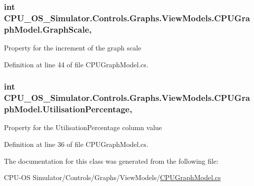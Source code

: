 \subsubsection[{Graph\+Scale}]{\setlength{\rightskip}{0pt plus 5cm}int C\+P\+U\+\_\+\+O\+S\+\_\+\+Simulator.\+Controls.\+Graphs.\+View\+Models.\+C\+P\+U\+Graph\+Model.\+Graph\+Scale\hspace{0.3cm}{\ttfamily [get]}, {\ttfamily [set]}}\label{class_c_p_u___o_s___simulator_1_1_controls_1_1_graphs_1_1_view_models_1_1_c_p_u_graph_model_a61f6ea27afc3a556bf44e36a90848b86}


Property for the increment of the graph scale 



Definition at line 44 of file C\+P\+U\+Graph\+Model.\+cs.

\hypertarget{class_c_p_u___o_s___simulator_1_1_controls_1_1_graphs_1_1_view_models_1_1_c_p_u_graph_model_ac751900c034f55f5666cbc2d8bc6428f}{}
\subsubsection[{Utilisation\+Percentage}]{\setlength{\rightskip}{0pt plus 5cm}int C\+P\+U\+\_\+\+O\+S\+\_\+\+Simulator.\+Controls.\+Graphs.\+View\+Models.\+C\+P\+U\+Graph\+Model.\+Utilisation\+Percentage\hspace{0.3cm}{\ttfamily [get]}, {\ttfamily [set]}}\label{class_c_p_u___o_s___simulator_1_1_controls_1_1_graphs_1_1_view_models_1_1_c_p_u_graph_model_ac751900c034f55f5666cbc2d8bc6428f}


Property for the Utilisation\+Percentage column value 



Definition at line 36 of file C\+P\+U\+Graph\+Model.\+cs.



The documentation for this class was generated from the following file\+:\begin{DoxyCompactItemize}
\item 
C\+P\+U-\/\+O\+S Simulator/\+Controls/\+Graphs/\+View\+Models/\hyperlink{_c_p_u_graph_model_8cs}{C\+P\+U\+Graph\+Model.\+cs}\end{DoxyCompactItemize}
